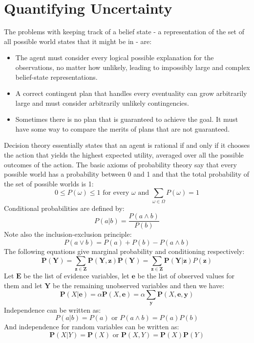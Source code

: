 \documentclass[twoside]{article}
\begin{document}
\section{Quantifying Uncertainty}
The problems with keeping track of a belief state - a representation of the set
of all possible world states that it might be in - are:
\begin{itemize}
        \item The agent must consider every logical possible explanation for
        the observations, no matter how unlikely, leading to impossibly large
        and complex belief-state representations.
        \item A correct contingent plan that handles every eventuality can 
        grow arbitrarily large and must consider arbitrarily unlikely 
        contingencies.
        \item Sometimes there is no plan that is guaranteed to achieve the 
        goal. It must have some way to compare the merits of plans that are 
        not guaranteed.
\end{itemize}
Decision theory essentially states that an agent is rational if and only if it 
chooses the action that yields the highest expected utility, averaged over all
the possible outcomes of the action. The basic axioms of probability theory say
that every possible world has a probability between 0 and 1 and that the total
probability of the set of possible worlds is 1:
\begin{equation}
        0 \leq P(\omega) \leq 1 \text{ for every } \omega \text{ and } \sum_{\omega \in \Omega} P(\omega) = 1
\end{equation}
Conditional probabilities are defined by:
\begin{equation}
        P(a|b) = \frac{P(a \land b)}{P(b)}
\end{equation}
Note also the inclusion-exclusion principle:
\begin{equation}
        P(a \lor b) = P(a) + P(b) - P(a \land b)
\end{equation}
The following equations give marginal probability and conditioning respectively:
\begin{equation}
        \mathbf{P(Y) = \sum_{z \in Z} P(Y, z)}
        \mathbf{P(Y) = \sum_{z \in Z}P(Y|z)}P(\mathbf{z})
\end{equation}
Let \(\mathbf{E}\) be the list of evidence variables, let \(\mathbf{e}\) be 
the list of observed values for them and let \(\mathbf{Y}\) be the remaining
unobserved variables and then we have:
\begin{equation}
        \mathbf P(X|\mathbf e) = \alpha \mathbf P(X, \mathbf e) = \alpha \sum_\mathbf y \mathbf P(X, \mathbf e, \mathbf y)
\end{equation}
Independence can be written as:
\begin{equation}
        P(a|b) = P(a) \text{ or } P(a \land b) = P(a)P(b)
\end{equation}
And independence for random variables can be written as:
\begin{equation}
        \mathbf P(X|Y) = \mathbf P(X) \text{ or } \mathbf P(X, Y) = \mathbf P(X) \mathbf P(Y)
\end{equation}
\end{document}
